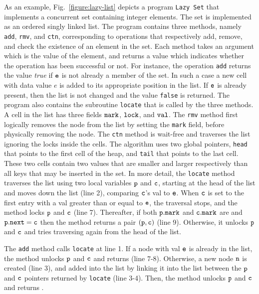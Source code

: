 As an example, Fig.~\ref{figure:lazy-list} depicts a program
{\tt Lazy Set} \cite{Lazyset}
that implements a concurrent set containing integer
elements.
%
The set is implemented as an ordered singly linked list.
%
The program contains three methods, namely {\tt add}, {\tt rmv},
and {\tt ctn},  corresponding to operations
that respectively add, remove, and check the existence
of an element in the set.
%
%
Each method takes an argument which is the value
of the element, and returns a value which indicates whether
the operation has been successful or not.
%
For instance, the operation {\tt add} returns the value
{\it true} if  $\tt e$ is not already a member of the set.
%
In such a case a new cell with data value $e$ is added to its
appropriate position in the list.
%
If $\tt e$ is already present, then the list is not changed and 
the value {\tt false} is returned.
% 
The program also contains the subroutine {\tt locate}
that is called by the three methods.
%
A cell in the list has  three fields ${\tt mark}$, ${\tt lock}$, and
${\tt val}$.
%
The {\tt rmv} method first logically removes the node
from the list by setting the {\tt mark} field, before 
physically removing the node.
%
The {\tt ctn} method is wait-free and traverses the list ignoring the locks
inside the cells. The algorithm uses two global pointers, {\tt head} that points to  the first cell of the heap, and {\tt tail} that points to the last cell.  
These two cells contain two values that are smaller 
and larger respectively than all keys that may be                     
inserted in the set. In more detail, the {\tt locate} method traverses the list using two local variables ${\tt p}$ and $\tt c$, starting at the head of the list and moves down the list (line 2), comparing ${\tt c}$’s val to ${\tt e}$. When $\tt c$ is set to the
first entry with a val greater than or equal to $\tt e$, the traversal stops, and the
method locks $\tt p$ and $\tt c$ (line 7). Thereafter, if both $\tt p.mark$ and $\tt c.mark$ are \false \; and ${\tt p.next = c}$ then the method returns a pair $\tt (p,c)$ (line 9). Otherwise, it unlocks $\tt p$ and $\tt c$ and tries traversing again from the head of the list.

The {\tt add} method calls {\tt locate} at line 1. If a node with val $\tt e$ is  already in the list, the method unlocks $\tt p$ and $\tt c$ and returns \false \; (line 7-8). Otherwise, a new node $\tt n$ is created (line 3), and added into the list by linking it into the list between the $\tt p$ and $\tt c$ pointers returned by
{\tt locate} (line 3-4). Then, the method unlocks $\tt p$ and $\tt c$ and returns \true.  

